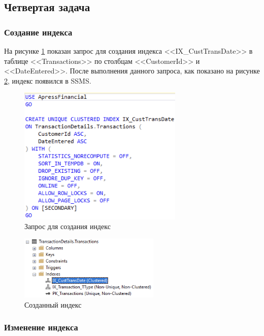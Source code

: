 \documentclass[a4paper, 14pt]{extarticle}
\begin{document}
\subsection{Четвертая задача}

\subsubsection{Создание индекса}

На рисунке \ref{fig:task-4-1} показан запрос для создания индекса
<<\foreignlanguage{english}{IX\_CustTransDate}>> в таблице
<<\foreignlanguage{english}{Transactions}>> по столбцам
<<\foreignlanguage{english}{CustomerId}>> и
<<\foreignlanguage{english}{DateEntered}>>. После выполнения данного запроса,
как показано на рисунке \ref{fig:task-4-2}, индекс появился в SSMS.

\begin{figure}[H]
  \centering
  \includegraphics[width=0.7\textwidth]{images/task-4/1.png}
  \caption{Запрос для создания индекс}
  \label{fig:task-4-1}
\end{figure}

\begin{figure}[H]
  \centering
  \includegraphics[width=0.6\textwidth]{images/task-4/2.png}
  \caption{Созданный индекс}
  \label{fig:task-4-2}
\end{figure}

\subsubsection{Изменение индекса}
\end{document}
